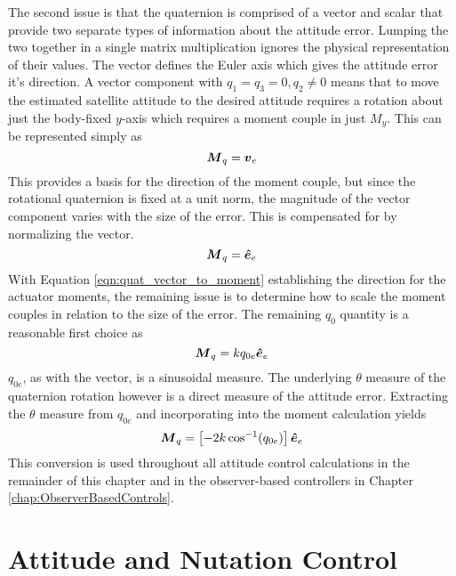 The second issue is that the quaternion is comprised of a vector and scalar that provide two separate types of information about the attitude error.  Lumping the two together in a single matrix multiplication ignores the physical representation of their values.  The vector defines the Euler axis which gives the attitude error it's direction.  A vector component with $q_1 = q_3 = 0, q_2 \ne 0$ means that to move the estimated satellite attitude to the desired attitude requires a rotation about just the body-fixed $y$-axis which requires a moment couple in just $M_y$.  This can be represented simply as
\begin{equation}
  \boldsymbol{M}_{q} = \boldsymbol{v}_e
\end{equation}
This provides a basis for the direction of the moment couple, but since the rotational quaternion is fixed at a unit norm, the magnitude of the vector component varies with the size of the error.  This is compensated for by normalizing the vector.
\begin{equation}
  \boldsymbol{M}_{q} = \boldsymbol{\hat{e}}_e
  \label{eqn:quat_vector_to_moment}
\end{equation}
With Equation \ref{eqn:quat_vector_to_moment} establishing the direction for the actuator moments, the remaining issue is to determine how to scale the moment couples in relation to the size of the error.  The remaining $q_0$ quantity is a reasonable first choice as
\begin{equation}
  \boldsymbol{M}_{q} = kq_{0e} \boldsymbol{\hat{e}}_e
\end{equation}
$q_{0e}$, as with the vector, is a sinusoidal measure.  The underlying $\theta$ measure of the quaternion rotation however is a direct measure of the attitude error.  Extracting the $\theta$ measure from $q_{0e}$ and incorporating into the moment calculation yields
\begin{equation}
  \boldsymbol{M}_{q} = \left[-2 k \cos^{-1} (q_{0e}) \right] \boldsymbol{\hat{e}}_e
  \label{eqn:QuaternionToMomentConversion}
\end{equation}
This conversion is used throughout all attitude control calculations in the remainder of this chapter and in the observer-based controllers in Chapter \ref{chap:ObserverBasedControls}.










\section{Attitude and Nutation Control}
\label{sec:AttitudeAndNutationControl}

